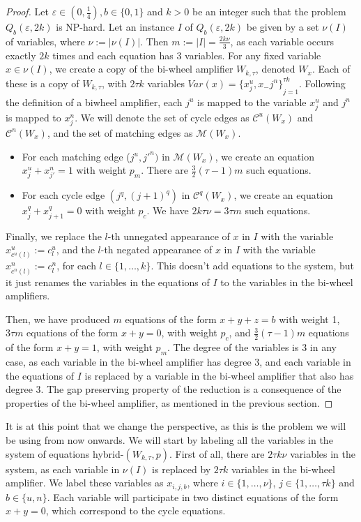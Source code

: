 \documentclass[12pt]{article}
\begin{document}
\begin{proof}
Let $\varepsilon \in (0, \frac{1}{4}),  b\in \{0,1\}$ and $k>0$ be an integer such that the problem $Q_b(\varepsilon, 2k)$ is NP-hard. Let an instance $I$ of $Q_b(\varepsilon, 2k)$ be given by a set $\nu(I)$ of variables, where $\nu:=|\nu(I)|$.
Then $m:=|I|=\frac{2k\nu}{3}$, as each variable occurs exactly $2k$ times and each equation has 3 variables.
For any fixed variable $x\in \nu(I)$, we create a copy of the bi-wheel amplifier $W_{k,\tau}$, denoted $W_x$. Each of these is a copy of $W_{k,\tau}$, with $2\tau k$ variables $Var(x)= {\{x_j^u, x_-j^n\}}_{j=1}^{\tau k}$.
Following the definition of a biwheel amplifier, each  $j^u$ is mapped to the variable $x^u_j$ and $j^n$ is mapped to $x^n_j$. 
We will denote the set of cycle edges as $\mathcal{C}^u(W_x)$ and $\mathcal{C}^n(W_x)$, and the set of matching edges as $\mathcal{M}(W_x)$.
\begin{itemize}
    \item For each matching edge ($j^u, j'^n)$ in $\mathcal{M}(W_x)$, we create an equation $x_j^u + x_{j'}^n = 1$ with weight $p_m$. There are $\frac{3}{2}(\tau-1)m$ such equations.
    \item For each cycle edge $(j^q, {(j+1)}^q)$ in $\mathcal{C}^q(W_x)$, we create an equation $x_j^q + x_{j+1}^q = 0$ with weight $p_c$. We have $2k\tau \nu= 3\tau m$ such equations.
\end{itemize}

Finally, we replace the $l$-th unnegated appearance of $x$ in $I$ with the variable $x^u_{c^u(l)}:=c_l^u$, and the $l$-th negated appearance of $x$ in $I$ with the variable $x^n_{c^n(l)}:=c_l^n$, for each $l\in \{1, \ldots, k\}$.
This doesn't add equations to the system, but it just renames the variables in the equations of $I$ to the variables in the bi-wheel amplifiers.

Then, we have produced $m$ equations of the form $x+y+z=b$ with weight 1, $3\tau m$ equations of the form $x+y=0$, with weight $p_c$, and $\frac{3}{2}(\tau-1) m$ equations of the form $x+y=1$, with weight $p_m$.
The degree of the variables is 3 in any case, as each variable in the bi-wheel amplifier has degree 3, and each variable in the equations of $I$ is replaced by a variable in the bi-wheel amplifier that also has degree 3.
The gap preserving property of the reduction is a consequence of the properties of the bi-wheel amplifier, as mentioned in the previous section.
\end{proof}

It is at this point that we change the perspective, as this is the problem we will be using from now onwards. 
We will start by labeling all the variables in the system of equations hybrid-$(W_{k,\tau},p)$. First of all, there are $2\tau k \nu$ variables in the system, as each variable in $\nu(I)$ is replaced by $2\tau k$ variables in the bi-wheel amplifier. 
We label these variables as $x_{i,j,b}$, where $i \in \{1, \ldots, \nu\}$, $j \in \{1, \ldots, \tau k\}$ and $b\in \{u,n\}$.
Each variable will participate in two distinct equations of the form $x+y=0$, which correspond to the cycle equations.
\end{document}
